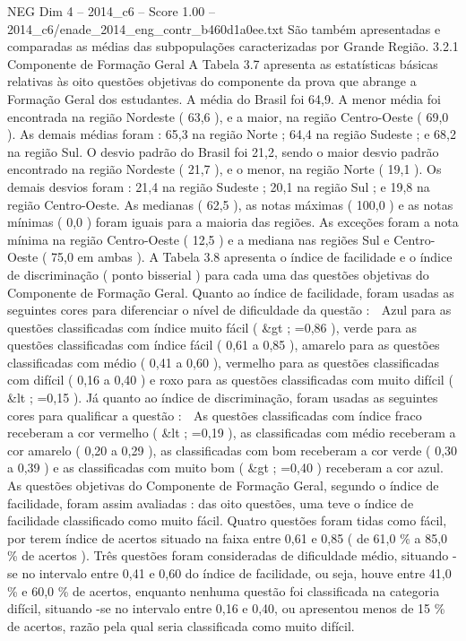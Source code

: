 \begin{textsample}{NEG Dim 4 – 2014\_c6 – Score 1.00 – 2014\_c6/enade\_2014\_eng\_contr\_b460d1a0ee.txt}
São também apresentadas e comparadas as médias das subpopulações caracterizadas por Grande Região. 3.2.1 Componente de Formação Geral A Tabela 3.7 apresenta as estatísticas básicas relativas às oito questões objetivas do componente da prova que abrange a Formação Geral dos estudantes.
A média do Brasil foi 64,9.
A menor média foi encontrada na região Nordeste ( 63,6 ), e a maior, na região Centro-Oeste ( 69,0 ).
As demais médias foram : 65,3 na região Norte ; 64,4 na região Sudeste ; e 68,2 na região Sul.
O desvio padrão do Brasil foi 21,2, sendo o maior desvio padrão encontrado na região Nordeste ( 21,7 ), e o menor, na região Norte ( 19,1 ).
Os demais desvios foram : 21,4 na região Sudeste ; 20,1 na região Sul ; e 19,8 na região Centro-Oeste.
As medianas ( 62,5 ), as notas máximas ( 100,0 ) e as notas mínimas ( 0,0 ) foram iguais para a maioria das regiões.
As exceções foram a nota mínima na região Centro-Oeste ( 12,5 ) e a mediana nas regiões Sul e Centro-Oeste ( 75,0 em ambas ).
A Tabela 3.8 apresenta o índice de facilidade e o índice de discriminação ( ponto bisserial ) para cada uma das questões objetivas do Componente de Formação Geral.
Quanto ao índice de facilidade, foram usadas as seguintes cores para diferenciar o nível de dificuldade da questão :  Azul para as questões classificadas com índice muito fácil ( \&gt ; =0,86 ), verde para as questões classificadas com índice fácil ( 0,61 a 0,85 ), amarelo para as questões classificadas com médio ( 0,41 a 0,60 ), vermelho para as questões classificadas com difícil ( 0,16 a 0,40 ) e roxo para as questões classificadas com muito difícil ( \&lt ; =0,15 ).
Já quanto ao índice de discriminação, foram usadas as seguintes cores para qualificar a questão :  As questões classificadas com índice fraco receberam a cor vermelho ( \&lt ; =0,19 ), as classificadas com médio receberam a cor amarelo ( 0,20 a 0,29 ), as classificadas com bom receberam a cor verde ( 0,30 a 0,39 ) e as classificadas com muito bom ( \&gt ; =0,40 ) receberam a cor azul.
As questões objetivas do Componente de Formação Geral, segundo o índice de facilidade, foram assim avaliadas : das oito questões, uma teve o índice de facilidade classificado como muito fácil.
Quatro questões foram tidas como fácil, por terem índice de acertos situado na faixa entre 0,61 e 0,85 ( de 61,0 \% a 85,0 \% de acertos ).
Três questões foram consideradas de dificuldade médio, situando -se no intervalo entre 0,41 e 0,60 do índice de facilidade, ou seja, houve entre 41,0 \% e 60,0 \% de acertos, enquanto nenhuma questão foi classificada na categoria difícil, situando -se no intervalo entre 0,16 e 0,40, ou apresentou menos de 15 \% de acertos, razão pela qual seria classificada como muito difícil.

\end{textsample}
